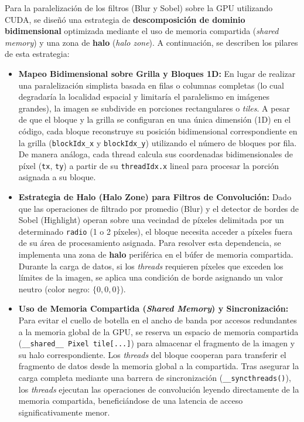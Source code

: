 Para la paralelización de los filtros (Blur y Sobel) sobre la GPU utilizando CUDA, se diseñó una estrategia de \textbf{descomposición de dominio bidimensional} optimizada mediante el uso de memoria compartida (\textit{shared memory}) y una zona de \textbf{halo} (\textit{halo zone}).
A continuación, se describen los pilares de esta estrategia:
\begin{itemize}
    \item \textbf{Mapeo Bidimensional sobre Grilla y Bloques 1D:} 
    En lugar de realizar una paralelización simplista basada en filas o columnas completas (lo cual degradaría la localidad espacial y limitaría el paralelismo en imágenes grandes), la imagen se subdivide en porciones rectangulares o \textit{tiles}. 
    A pesar de que el bloque y la grilla se configuran en una única dimensión (1D) en el código, cada bloque reconstruye su posición bidimensional correspondiente en la grilla (\texttt{blockIdx\_x} y \texttt{blockIdx\_y}) utilizando el número de bloques por fila. De manera análoga, cada thread calcula sus coordenadas bidimensionales de píxel (\texttt{tx}, \texttt{ty}) a partir de su \texttt{threadIdx.x} lineal para procesar la porción asignada a su bloque.
    
    \item \textbf{Estrategia de Halo (Halo Zone) para Filtros de Convolución:}
    Dado que las operaciones de filtrado por promedio (Blur) y el detector de bordes de Sobel (Highlight) operan sobre una vecindad de píxeles delimitada por un determinado \texttt{radio} (1 o 2 píxeles), el bloque necesita acceder a píxeles fuera de su área de procesamiento asignada. Para resolver esta dependencia, se implementa una zona de \textbf{halo} periférica en el búfer de memoria compartida. Durante la carga de datos, si los \textit{threads} requieren píxeles que exceden los límites de la imagen, se aplica una condición de borde asignando un valor neutro (color negro: $\{0,0,0\}$).
    
    \item \textbf{Uso de Memoria Compartida (\textit{Shared Memory}) y Sincronización:}
    Para evitar el cuello de botella en el ancho de banda por accesos redundantes a la memoria global de la GPU, se reserva un espacio de memoria compartida (\texttt{\_\_shared\_\_ Pixel tile[...]}) para almacenar el fragmento de la imagen y su halo correspondiente. 
    Los \textit{threads} del bloque cooperan para transferir el fragmento de datos desde la memoria global a la compartida. Tras asegurar la carga completa mediante una barrera de sincronización (\texttt{\_\_syncthreads()}), los \textit{threads} ejecutan las operaciones de convolución leyendo directamente de la memoria compartida, beneficiándose de una latencia de acceso significativamente menor.
\end{itemize}

